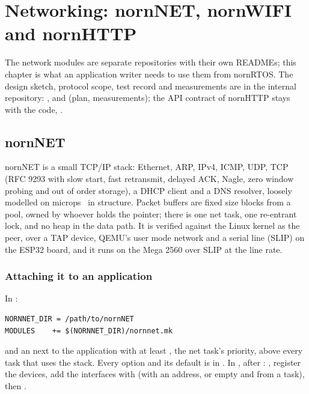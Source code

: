 \chapter{Networking: nornNET, nornWIFI and nornHTTP}
\label{ch:net}

The network modules are separate repositories with their own READMEs; this chapter is
what an application writer needs to use them from nornRTOS. The design sketch, protocol
scope, test record and measurements are in the internal repository:
,  and
 (plan, measurements); the API contract of nornHTTP stays
with the code, .

\section{nornNET}

nornNET is a small TCP/IP stack: Ethernet, ARP, IPv4, ICMP, UDP, TCP (RFC 9293 with slow
start, fast retransmit, delayed ACK, Nagle, zero window probing and out of order
storage), a DHCP client and a DNS resolver, loosely modelled on microps~\cite{microps} in
structure. Packet buffers are fixed size blocks from a pool, owned by whoever holds the
pointer; there is one net task, one re-entrant lock, and no heap in the data path. It is
verified against the Linux kernel as the peer, over a TAP device, QEMU's user mode
network and a serial line (SLIP) on the ESP32 board, and it runs on the Mega 2560 over
SLIP at the line rate.

\subsection{Attaching it to an application}

In :
\begin{lstlisting}[language={}]
NORNNET_DIR = /path/to/nornNET
MODULES    += $(NORNNET_DIR)/nornnet.mk
\end{lstlisting}
and an  next to the application with at least
, the net task's priority, above every task that uses the
stack. Every  option and its default is in . In
, after : , register the devices, add the
interfaces with  (with an address, or empty and 
from a task), then .

